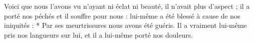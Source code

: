 Voici que nous l’avons vu n’ayant ni éclat ni beauté, il n’avait plus d’aspect ; il a porté nos péchés et il souffre pour nous : lui-même a été blessé à cause de nos iniquités : * Par ses meurtrissures nous avons été guéris.
\versseparator
Il a vraiment lui-même pris nos langueurs sur lui, et il a lui-même porté nos douleurs.
